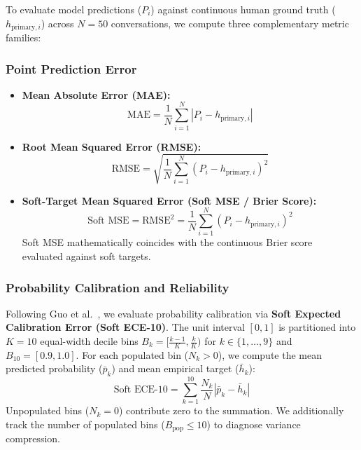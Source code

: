 To evaluate model predictions ($P_i$) against continuous human ground truth ($h_{\text{primary}, i}$) across $N = 50$ conversations, we compute three complementary metric families:

\subsubsection{Point Prediction Error}
\begin{itemize}
    \item \textbf{Mean Absolute Error (MAE):}
    \begin{equation}
        \text{MAE} = \frac{1}{N}\sum_{i=1}^N |P_i - h_{\text{primary}, i}|
    \end{equation}
    \item \textbf{Root Mean Squared Error (RMSE):}
    \begin{equation}
        \text{RMSE} = \sqrt{\frac{1}{N}\sum_{i=1}^N (P_i - h_{\text{primary}, i})^2}
    \end{equation}
    \item \textbf{Soft-Target Mean Squared Error (Soft MSE / Brier Score):}
    \begin{equation}
        \text{Soft MSE} = \text{RMSE}^2 = \frac{1}{N}\sum_{i=1}^N (P_i - h_{\text{primary}, i})^2
    \end{equation}
    Soft MSE mathematically coincides with the continuous Brier score~\cite{brier1950verification} evaluated against soft targets.
\end{itemize}

\subsubsection{Probability Calibration and Reliability}
Following Guo et al.~\cite{guo2017calibration}, we evaluate probability calibration via \textbf{Soft Expected Calibration Error (Soft ECE-10)}. The unit interval $[0, 1]$ is partitioned into $K = 10$ equal-width decile bins $B_k = [\frac{k-1}{K}, \frac{k}{K})$ for $k \in \{1, \dots, 9\}$ and $B_{10} = [0.9, 1.0]$. For each populated bin ($N_k > 0$), we compute the mean predicted probability ($\bar{p}_k$) and mean empirical target ($\bar{h}_k$):
\begin{equation}
    \text{Soft ECE-10} = \sum_{k=1}^{10} \frac{N_k}{N} |\bar{p}_k - \bar{h}_k|
    \label{eq:ece}
\end{equation}
Unpopulated bins ($N_k = 0$) contribute zero to the summation. We additionally track the number of populated bins ($B_{\text{pop}} \le 10$) to diagnose variance compression.

